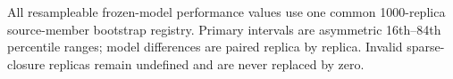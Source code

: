 All resampleable frozen-model performance values use one common 1000-replica source-member bootstrap registry. Primary intervals are asymmetric 16th--84th percentile ranges; model differences are paired replica by replica. Invalid sparse-closure replicas remain undefined and are never replaced by zero.
